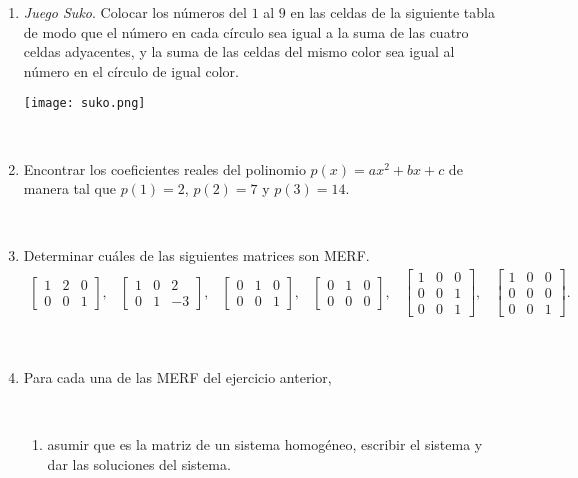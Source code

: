 \documentclass[12pt]{amsart}
\begin{document}
\begin{enumerate}
\item {\it Juego Suko}. Colocar los n\'umeros del $1$ al $9$ en las celdas de la siguiente tabla de modo que el n\'umero en cada c\'irculo sea igual a la suma de las cuatro celdas adyacentes, y la suma de las celdas del mismo color sea igual al n\'umero en el c\'irculo de igual color.

\begin{center}
\texttt{[image: suko.png]}
\end{center}

\

\item\label{polinomio} Encontrar los coeficientes reales del polinomio $p(x) = ax^2+bx+c$ de manera tal que $p(1)=2$, $p(2)=7$ y $p(3)=14$.

\

\item Determinar cu{\'a}les de las siguientes matrices son MERF.
$$\begin{array}{lccccl}
\begin{bmatrix}1 & 2 & 0 \\0 & 0 & 1 \end{bmatrix}, &
\begin{bmatrix}1 & 0 & 2 \\0 & 1 & -3 \end{bmatrix}, &
\begin{bmatrix}0 & 1 & 0 \\0 & 0 & 1 \end{bmatrix}, &
\begin{bmatrix}0 & 1 & 0 \\0 & 0 & 0 \end{bmatrix}, &
\begin{bmatrix}1 & 0 & 0  \\0 & 0 & 1 \\0 & 0 & 1 \end{bmatrix},&
\begin{bmatrix}1 & 0 & 0  \\0 & 0 & 0 \\0 & 0 & 1 \end{bmatrix}.
\end{array}$$

\

\item Para cada una de las MERF del ejercicio anterior,

\

\begin{enumerate}
\item
asumir que es la matriz de un sistema homog\'eneo, escribir el sistema
y dar las soluciones del sistema.


\end{enumerate}
\end{enumerate}
\end{document}
